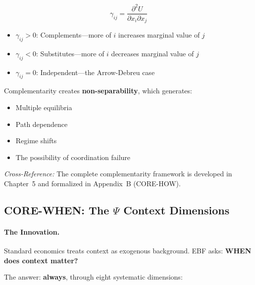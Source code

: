 \begin{equation}
\gamma_{ij} = \frac{\partial^2 U}{\partial x_i \partial x_j}
\end{equation}

\begin{itemize}
\item $\gamma_{ij} > 0$: Complements---more of $i$ increases marginal value of $j$
\item $\gamma_{ij} < 0$: Substitutes---more of $i$ decreases marginal value of $j$
\item $\gamma_{ij} = 0$: Independent---the Arrow-Debreu case
\end{itemize}

Complementarity creates \textbf{non-separability}, which generates:
\begin{itemize}[nosep]
\item Multiple equilibria
\item Path dependence
\item Regime shifts
\item The possibility of coordination failure
\end{itemize}

\textit{Cross-Reference:} The complete complementarity framework is developed
in Chapter~5 and formalized in Appendix~B (CORE-HOW).

\subsection{CORE-WHEN: The $\Psi$ Context Dimensions}
\label{sec:10c-when}

\paragraph{The Innovation.}
Standard economics treats context as exogenous background. EBF asks:
\textbf{WHEN does context matter?}

The answer: \textbf{always}, through eight systematic dimensions:

